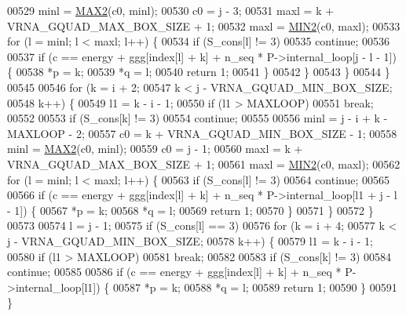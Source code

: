 \begin{DoxyCode}
00529       minl  = \hyperlink{group__utils_ga33297b3679c713b0c4d897cd0fe3b122}{MAX2}(c0, minl);
00530       c0    = j - 3;
00531       maxl  = k + VRNA\_GQUAD\_MAX\_BOX\_SIZE + 1;
00532       maxl  = \hyperlink{group__utils_gae0b9cd0ce090bd69b951aa73e8fa4f7d}{MIN2}(c0, maxl);
00533       \textcolor{keywordflow}{for} (l = minl; l < maxl; l++) \{
00534         \textcolor{keywordflow}{if} (S\_cons[l] != 3)
00535           \textcolor{keywordflow}{continue};
00536 
00537         \textcolor{keywordflow}{if} (c == energy + ggg[index[l] + k] + n\_seq * P->internal\_loop[j - l - 1]) \{
00538           *p  = k;
00539           *q  = l;
00540           \textcolor{keywordflow}{return} 1;
00541         \}
00542       \}
00543     \}
00544   \}
00545 
00546   \textcolor{keywordflow}{for} (k = i + 2;
00547        k < j - VRNA\_GQUAD\_MIN\_BOX\_SIZE;
00548        k++) \{
00549     l1 = k - i - 1;
00550     \textcolor{keywordflow}{if} (l1 > MAXLOOP)
00551       \textcolor{keywordflow}{break};
00552 
00553     \textcolor{keywordflow}{if} (S\_cons[k] != 3)
00554       \textcolor{keywordflow}{continue};
00555 
00556     minl  = j - i + k - MAXLOOP - 2;
00557     c0    = k + VRNA\_GQUAD\_MIN\_BOX\_SIZE - 1;
00558     minl  = \hyperlink{group__utils_ga33297b3679c713b0c4d897cd0fe3b122}{MAX2}(c0, minl);
00559     c0    = j - 1;
00560     maxl  = k + VRNA\_GQUAD\_MAX\_BOX\_SIZE + 1;
00561     maxl  = \hyperlink{group__utils_gae0b9cd0ce090bd69b951aa73e8fa4f7d}{MIN2}(c0, maxl);
00562     \textcolor{keywordflow}{for} (l = minl; l < maxl; l++) \{
00563       \textcolor{keywordflow}{if} (S\_cons[l] != 3)
00564         \textcolor{keywordflow}{continue};
00565 
00566       \textcolor{keywordflow}{if} (c == energy + ggg[index[l] + k] + n\_seq * P->internal\_loop[l1 + j - l - 1]) \{
00567         *p  = k;
00568         *q  = l;
00569         \textcolor{keywordflow}{return} 1;
00570       \}
00571     \}
00572   \}
00573 
00574   l = j - 1;
00575   \textcolor{keywordflow}{if} (S\_cons[l] == 3)
00576     \textcolor{keywordflow}{for} (k = i + 4;
00577          k < j - VRNA\_GQUAD\_MIN\_BOX\_SIZE;
00578          k++) \{
00579       l1 = k - i - 1;
00580       \textcolor{keywordflow}{if} (l1 > MAXLOOP)
00581         \textcolor{keywordflow}{break};
00582 
00583       \textcolor{keywordflow}{if} (S\_cons[k] != 3)
00584         \textcolor{keywordflow}{continue};
00585 
00586       \textcolor{keywordflow}{if} (c == energy + ggg[index[l] + k] + n\_seq * P->internal\_loop[l1]) \{
00587         *p  = k;
00588         *q  = l;
00589         \textcolor{keywordflow}{return} 1;
00590       \}
00591     \}

\end{DoxyCode}
